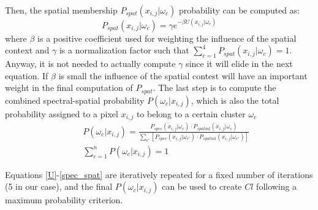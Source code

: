 \documentclass[a4paper, 10pt, conference]{ieeeconf}      %
\begin{document}
Then, the spatial membership $P_{spat}(x_{i,j}|\omega_c)$ probability can be computed as:
%
\begin{equation} \label{spatial}
P_{spat}(x_{i,j}|\omega_c) = \gamma e^{-\beta U(x_{i,j}|\omega_c)}
\end{equation}
%
where $\beta$ is a positive coefficient used for weighting  the influence of the spatial context and $\gamma$ is a normalization factor such that $\sum_{c=1}^4 P_{spat}(x_{i,j}|\omega_c)=1$.
Anyway, it is not needed to actually compute $\gamma$ since it will elide in the next equation.
%
If $\beta$ is small the influence of the spatial contest will have an important weight in the final computation of $P_{spat}$.
%
The last step is to compute the combined spectral-spatial probability $P(\omega_c|x_{i,j})$, which is also the total probability  assigned to a pixel $x_{i,j}$ to belong to a certain cluster $\omega_c$ 
%
\begin{eqnarray}  \label{spec_spat}
&&P(\omega_c|x_{i,j}) = \frac{P_{spec}(x_{i,j}|\omega_c) \cdot P_{spatial}(x_{i,j}|\omega_c) }{\sum_{c'}[P_{spec}(x_{i,j}|\omega_{c'}) \cdot P_{spatial}(x_{i,j}|\omega_{c'})]}  \nonumber\\
 &&\sum_{c=1}^n P(\omega_c|x_{i,j})=1
\end{eqnarray}

Equations  \eqref{U}-\eqref{spec_spat} are iteratively repeated for a fixed number of iterations (5 in our case), and the final $P(\omega_c|x_{i,j})$ can be used to create $Cl$ following a maximum probability criterion.




\end{document}

